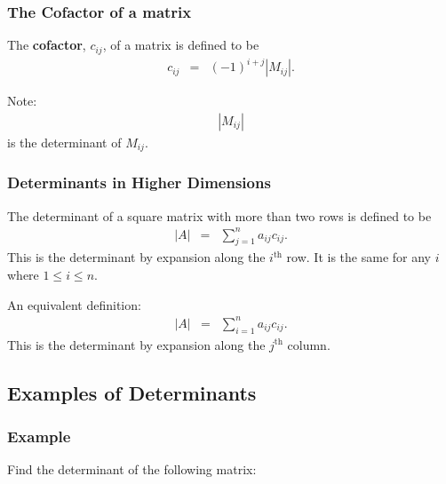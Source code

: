\begin{frame}
  \frametitle{The Cofactor of a matrix}

  The \textbf{cofactor}, $c_{ij}$, of a matrix is defined to be 
  \begin{eqnarray*}
    c_{ij} & = & (-1)^{i+j}\left| M_{ij} \right|.
  \end{eqnarray*}

  Note:
  \begin{eqnarray*}
    \left| M_{ij} \right|
  \end{eqnarray*}
  is the determinant of $M_{ij}$.

\end{frame}


\begin{frame}
  \frametitle{Determinants in Higher Dimensions}

  The determinant of a square matrix with more than two rows is
  defined to be
  \begin{eqnarray*}
    \left| A \right| & = & \sum^n_{j=1} a_{ij} c_{ij}.
  \end{eqnarray*}
  This is the determinant by expansion along the $i^{\mathrm{th}}$
  row. It is the same for any $i$ where $1\leq i \leq n$.

  An equivalent definition:
  \begin{eqnarray*}
    \left| A \right| & = & \sum^n_{i=1} a_{ij} c_{ij}.
  \end{eqnarray*}
  This is the determinant by expansion along the $j^{\mathrm{th}}$
  column.

  

\end{frame}


\subsection{Examples of Determinants}

\begin{frame}
  \frametitle{Example}

  Find the determinant of the following matrix:





\end{frame}

